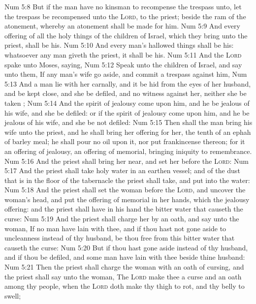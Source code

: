 \vs Num 5:8 But if the man have no kinsman to recompense the trespass unto, let the trespass be recompensed unto the \textsc{Lord},  to the priest; beside the ram of the atonement, whereby an atonement shall be made for him.
\vs Num 5:9 And every offering of all the holy things of the children of Israel, which they bring unto the priest, shall be his.
\vs Num 5:10 And every man's hallowed things shall be his: whatsoever any man giveth the priest, it shall be his.
\vs Num 5:11 And the \textsc{Lord} spake unto Moses, saying,
\vs Num 5:12 Speak unto the children of Israel, and say unto them, If any man's wife go aside, and commit a trespass against him,
\vs Num 5:13 And a man lie with her carnally, and it be hid from the eyes of her husband, and be kept close, and she be defiled, and  no witness against her, neither she be taken ;
\vs Num 5:14 And the spirit of jealousy come upon him, and he be jealous of his wife, and she be defiled: or if the spirit of jealousy come upon him, and he be jealous of his wife, and she be not defiled:
\vs Num 5:15 Then shall the man bring his wife unto the priest, and he shall bring her offering for her, the tenth  of an ephah of barley meal; he shall pour no oil upon it, nor put frankincense thereon; for it  an offering of jealousy, an offering of memorial, bringing iniquity to remembrance.
\vs Num 5:16 And the priest shall bring her near, and set her before the \textsc{Lord}:
\vs Num 5:17 And the priest shall take holy water in an earthen vessel; and of the dust that is in the floor of the tabernacle the priest shall take, and put  into the water:
\vs Num 5:18 And the priest shall set the woman before the \textsc{Lord}, and uncover the woman's head, and put the offering of memorial in her hands, which  the jealousy offering: and the priest shall have in his hand the bitter water that causeth the curse:
\vs Num 5:19 And the priest shall charge her by an oath, and say unto the woman, If no man have lain with thee, and if thou hast not gone aside to uncleanness  instead of thy husband, be thou free from this bitter water that causeth the curse:
\vs Num 5:20 But if thou hast gone aside  instead of thy husband, and if thou be defiled, and some man have lain with thee beside thine husband:
\vs Num 5:21 Then the priest shall charge the woman with an oath of cursing, and the priest shall say unto the woman, The \textsc{Lord} make thee a curse and an oath among thy people, when the \textsc{Lord} doth make thy thigh to rot, and thy belly to swell;
